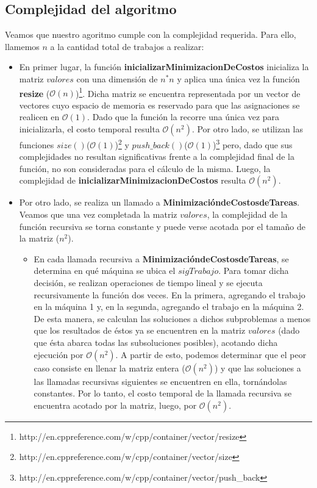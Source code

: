 \subsection{Complejidad del algoritmo}

Veamos que nuestro agoritmo cumple con la complejidad requerida. Para ello, llamemos $n$ a la cantidad total de trabajos a realizar:
\begin{itemize}
\item En primer lugar, la función \textbf{inicializarMinimizacionDeCostos} inicializa la matriz $valores$ con una dimensión de $n^*n$ y aplica una única vez la función \textbf{resize} ($\mathcal{O}(n)$)\footnote{http://en.cppreference.com/w/cpp/container/vector/resize}. Dicha matriz se encuentra representada por un vector de vectores cuyo espacio de memoria es reservado para que las asignaciones se realicen en $\mathcal{O}(1)$. Dado que la función la recorre una única vez para inicializarla, el costo temporal resulta $\mathcal{O}(n^{2})$. Por otro lado, se utilizan las funciones $size()$($\mathcal{O}(1)$)\footnote{http://en.cppreference.com/w/cpp/container/vector/size} y $push\_back()$($\mathcal{O}(1)$)\footnote{http://en.cppreference.com/w/cpp/container/vector/push\_back} pero, dado que sus complejidades no resultan significativas frente a la complejidad final de la función, no son consideradas para el cálculo de la misma. Luego, la complejidad de \textbf{inicializarMinimizacionDeCostos} resulta $\mathcal{O}(n^{2})$.

\item Por otro lado, se realiza un llamado a \textbf{MinimizacióndeCostosdeTareas}. Veamos que una vez completada la matriz $valores$, la complejidad de la función recursiva se torna constante y puede verse acotada por el tamaño de la matriz ($n^{2}$).
\begin{itemize}
\item En cada llamada recursiva a \textbf{MinimizacióndeCostosdeTareas}, se determina en qué máquina se ubica el $sigTrabajo$. Para tomar dicha decisión, se realizan operaciones de tiempo lineal y se ejecuta recursivamente la función dos veces. En la primera, agregando el trabajo en la máquina 1 y, en la segunda, agregando el trabajo en la máquina 2. De esta manera, se calculan las soluciones a dichos subproblemas a menos que los resultados de éstos ya se encuentren en la matriz $valores$ (dado que ésta abarca todas las subsoluciones posibles), acotando dicha ejecución por $\mathcal{O}(n^{2})$. A partir de esto, podemos determinar que el peor caso consiste en llenar la matriz entera ($\mathcal{O}(n^{2})$) y que las soluciones a las llamadas recursivas siguientes se encuentren en ella, tornándolas constantes. Por lo tanto, el costo temporal de la llamada recursiva se encuentra acotado por la matriz, luego, por $\mathcal{O}(n^{2})$. 


\end{itemize}
\end{itemize}
